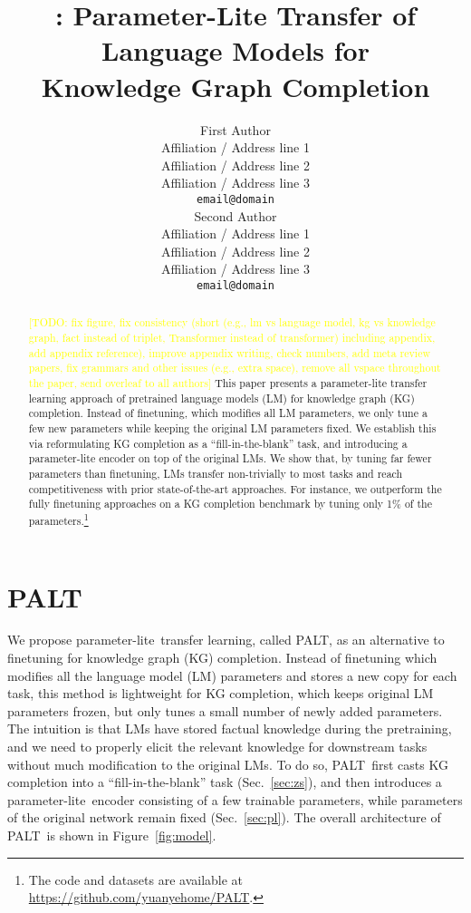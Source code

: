 \documentclass[11pt]{article}
\title{\method: Parameter-Lite Transfer of Language Models for \\ Knowledge Graph Completion}
\author{First Author \\
  Affiliation / Address line 1 \\
  Affiliation / Address line 2 \\
  Affiliation / Address line 3 \\
  \texttt{email@domain} \\\And
  Second Author \\
  Affiliation / Address line 1 \\
  Affiliation / Address line 2 \\
  Affiliation / Address line 3 \\
  \texttt{email@domain} \\}
\newcommand{\method}{\textsc{PALT}}
\newcommand{\pl}{parameter-lite}
\newcommand{\todo}[1]{\textcolor{yellow}{[TODO: #1]}}
\newcommand{\todo}[1]{}
\begin{document}
\maketitle
 
\begin{abstract}
\todo{fix figure, fix consistency (short (e.g., lm vs language model, kg vs knowledge graph, fact instead of triplet, Transformer instead of transformer) including appendix, add appendix reference), improve appendix writing, check numbers, add meta review papers, fix grammars and other issues (e.g., extra space), remove all vspace throughout the paper, send overleaf to all authors}
This paper presents a parameter-lite transfer learning approach of pretrained language models (LM) for knowledge graph (KG) completion. Instead of finetuning, which modifies all LM parameters, we only tune a few new parameters while keeping the original LM parameters fixed. We establish this via reformulating KG completion as a ``fill-in-the-blank'' task, and introducing a parameter-lite encoder on top of the original LMs. We show that, by tuning far fewer parameters than finetuning, LMs transfer non-trivially to most tasks and reach competitiveness with prior state-of-the-art approaches. For instance, we outperform the fully finetuning approaches on a KG completion benchmark by tuning only 1\% of the parameters.\footnote{\label{ft:opensource}The code and datasets are available at \url{https://github.com/yuanyehome/PALT}.}
\end{abstract}

 
\section{\method}
We propose \pl\ transfer learning, called \method, as an alternative to finetuning for knowledge graph (KG) completion. Instead of finetuning which modifies all the language model (LM) parameters and stores a new copy for each task, this method is lightweight for KG completion, which keeps original LM parameters frozen, but only tunes a small number of newly added parameters. The intuition is that LMs have stored factual knowledge during the pretraining, and we need to properly elicit the relevant knowledge for downstream tasks without much modification to the original LMs. To do so, \method\ first casts KG completion into a ``fill-in-the-blank'' task (Sec.~\ref{sec:zs}), 
and then introduces a \pl\ encoder consisting of a few trainable parameters, while parameters of the original network remain fixed (Sec.~\ref{sec:pl}). The overall architecture of \method\ is shown in Figure~\ref{fig:model}. 
\end{document}

